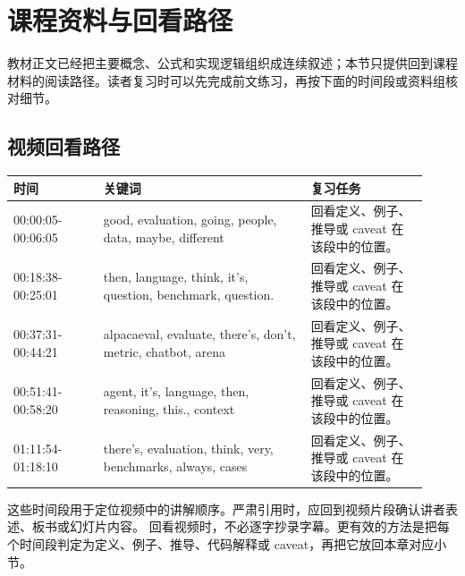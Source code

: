 \documentclass[a4paper]{article}
\begin{document}
\section{课程资料与回看路径}
教材正文已经把主要概念、公式和实现逻辑组织成连续叙述；本节只提供回到课程材料的阅读路径。读者复习时可以先完成前文练习，再按下面的时间段或资料组核对细节。
\subsection{视频回看路径}
\begin{longtable}{p{0.20\linewidth}p{0.46\linewidth}p{0.26\linewidth}}
\toprule
\textbf{时间} & \textbf{关键词} & \textbf{复习任务}\\
\midrule
00:00:05-00:06:05 & good, evaluation, going, people, data, maybe, different & 回看定义、例子、推导或 caveat 在该段中的位置。\\
00:18:38-00:25:01 & then, language, think, it's, question, benchmark, question. & 回看定义、例子、推导或 caveat 在该段中的位置。\\
00:37:31-00:44:21 & alpacaeval, evaluate, there's, don't, metric, chatbot, arena & 回看定义、例子、推导或 caveat 在该段中的位置。\\
00:51:41-00:58:20 & agent, it's, language, then, reasoning, this., context & 回看定义、例子、推导或 caveat 在该段中的位置。\\
01:11:54-01:18:10 & there's, evaluation, think, very, benchmarks, always, cases & 回看定义、例子、推导或 caveat 在该段中的位置。\\
\bottomrule
\end{longtable}
这些时间段用于定位视频中的讲解顺序。严肃引用时，应回到视频片段确认讲者表述、板书或幻灯片内容。
回看视频时，不必逐字抄录字幕。更有效的方法是把每个时间段判定为定义、例子、推导、代码解释或 caveat，再把它放回本章对应小节。
\end{document}
